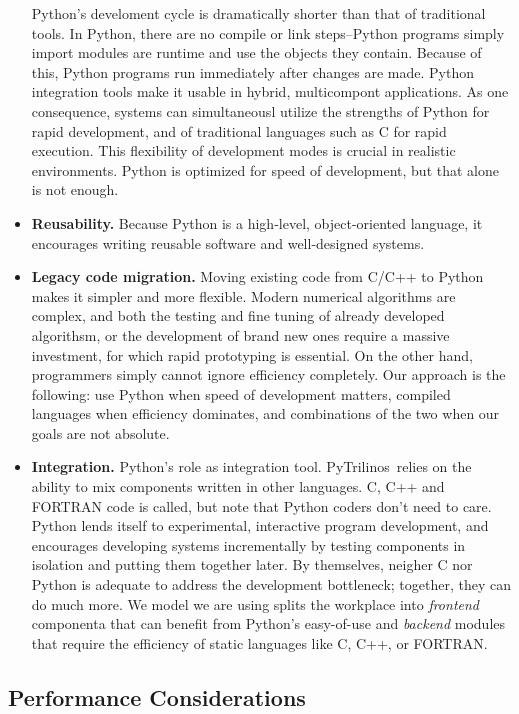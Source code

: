 \documentclass[10pt,relax]{SANDreport}
\newcommand{\PyTrilinos}{{PyTrilinos}}
\begin{document}
\begin{itemize}
  Python's
  develoment cycle is dramatically shorter than that of traditional tools. In
  Python, there are no compile or link steps--Python programs simply import
  modules are runtime and use the objects they contain. Because of this,
Python programs run immediately after changes are made. Python integration
  tools make it usable in hybrid, multicompont applications. As one
  consequence, systems can simultaneousl utilize the strengths of Python for
  rapid development, and of traditional languages such as C for rapid
  execution.
  This flexibility of development modes is crucial in realistic environments.
  Python is optimized for speed of development, but that alone is not enough.
%
\item {\bf Reusability.} Because Python is a high-level, object-oriented
language, it encourages writing reusable software and well-designed systems.
%
\item {\bf Legacy code migration.} Moving existing code from C/C++ to Python
makes it simpler and more flexible.
Modern numerical
algorithms are complex, and both the testing and fine tuning of already
developed algorithsm, or the development of brand new ones require a massive
investment, for which rapid prototyping is essential. On the other hand,
programmers simply cannot ignore efficiency completely. Our approach is the
following: use Python when speed of development matters, compiled languages
when efficiency dominates, and combinations of the two when our goals are
not absolute.
%
\item {\bf Integration.} Python's role as integration tool. \PyTrilinos\ relies
on the ability to mix components written in other languages. C, C++ and
FORTRAN code is called, but note that Python coders don't need to care.
  Python lends itself to experimental, interactive program development, and
  encourages developing systems incrementally by testing components in
  isolation and putting them together later.
  By themselves, neigher C nor Python is adequate to address the development
  bottleneck; together, they can do much more. We model we are using splits
  the workplace into {\sl frontend} componenta that can benefit from Python's
  easy-of-use and {\sl backend} modules that require the efficiency of static
  languages like C, C++, or FORTRAN.
%
\end{itemize}

\subsection{Performance Considerations}
\label{sec:performance}
\end{document}
